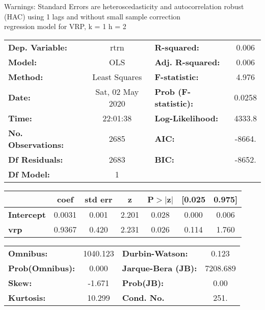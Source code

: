 Warnings: \newline
 [1] Standard Errors are heteroscedasticity and autocorrelation robust (HAC) using 1 lags and without small sample correction\\ 

regression model for VRP, k = 1 h = 2\begin{center}
\begin{tabular}{lclc}
\toprule
\textbf{Dep. Variable:}    &       rtrn       & \textbf{  R-squared:         } &     0.006   \\
\textbf{Model:}            &       OLS        & \textbf{  Adj. R-squared:    } &     0.006   \\
\textbf{Method:}           &  Least Squares   & \textbf{  F-statistic:       } &     4.976   \\
\textbf{Date:}             & Sat, 02 May 2020 & \textbf{  Prob (F-statistic):} &   0.0258    \\
\textbf{Time:}             &     22:01:38     & \textbf{  Log-Likelihood:    } &    4333.8   \\
\textbf{No. Observations:} &        2685      & \textbf{  AIC:               } &    -8664.   \\
\textbf{Df Residuals:}     &        2683      & \textbf{  BIC:               } &    -8652.   \\
\textbf{Df Model:}         &           1      & \textbf{                     } &             \\
\bottomrule
\end{tabular}
\begin{tabular}{lcccccc}
                   & \textbf{coef} & \textbf{std err} & \textbf{z} & \textbf{P$> |$z$|$} & \textbf{[0.025} & \textbf{0.975]}  \\
\midrule
\textbf{Intercept} &       0.0031  &        0.001     &     2.201  &         0.028        &        0.000    &        0.006     \\
\textbf{vrp}       &       0.9367  &        0.420     &     2.231  &         0.026        &        0.114    &        1.760     \\
\bottomrule
\end{tabular}
\begin{tabular}{lclc}
\textbf{Omnibus:}       & 1040.123 & \textbf{  Durbin-Watson:     } &    0.123  \\
\textbf{Prob(Omnibus):} &   0.000  & \textbf{  Jarque-Bera (JB):  } & 7208.689  \\
\textbf{Skew:}          &  -1.671  & \textbf{  Prob(JB):          } &     0.00  \\
\textbf{Kurtosis:}      &  10.299  & \textbf{  Cond. No.          } &     251.  \\
\bottomrule
\end{tabular}
\end{center}

